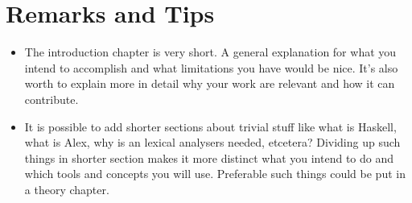 \documentclass{article}
\begin{document}
\section*{Remarks and Tips}
\begin{itemize}
\item The introduction chapter is very short. A general explanation for what you
intend to accomplish and what limitations you have would be nice. It's also worth
to explain more in detail why your work are relevant and how it can
contribute.

\item It is possible to add shorter sections about trivial stuff like what
is Haskell, what is Alex, why is an lexical analysers needed, etcetera? Dividing
up such things in shorter section makes it more distinct what you intend to do
and which tools and concepts you will use. Preferable such things could be put in
a theory chapter.


\end{itemize}
\end{document}
